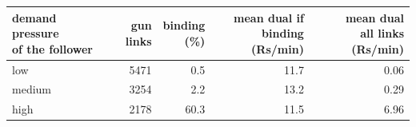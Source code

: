 \begin{tabular}{@{}lrrrr@{}}
\toprule
\shortstack[l]{demand pressure\\of the follower} & gun links & \shortstack[r]{binding\\(\%)} & \shortstack[r]{mean dual if\\binding (Rs/min)} & \shortstack[r]{mean dual\\all links (Rs/min)} \\
\midrule
low & 5471 & 0.5 & 11.7 & 0.06 \\
medium & 3254 & 2.2 & 13.2 & 0.29 \\
high & 2178 & 60.3 & 11.5 & 6.96 \\
\bottomrule
\end{tabular}
